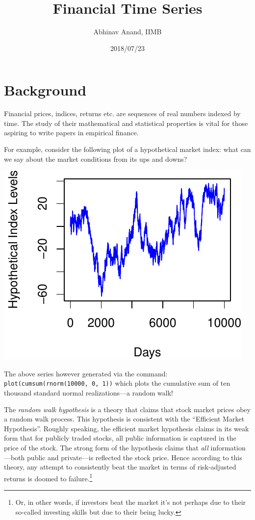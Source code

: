 \documentclass[11pt,]{article}
\title{Financial Time Series}
\author{Abhinav Anand, IIMB}
\date{2018/07/23}
\let\rmarkdownfootnote\footnote%
\def\footnote{\protect\rmarkdownfootnote}
\begin{document}
\maketitle

\section{Background}\label{background}

Financial prices, indices, returns etc. are sequences of real numbers
indexed by time. The study of their mathematical and statistical
properties is vital for those aspiring to write papers in empirical
finance.

For example, consider the following plot of a hypothetical market index:
what can we say about the market conditions from its ups and downs?

\begin{center}\includegraphics{FMC_T4_PhD_Fin_Time_Series_files/figure-latex/hypo_market_index-1} \end{center}

The above series however generated via the command:
\texttt{plot(cumsum(rnorm(10000,\ 0,\ 1))} which plots the cumulative
sum of ten thousand standard normal realizations---a random walk!

The \emph{random walk hypothesis} is a theory that claims that stock
market prices obey a random walk process. This hypothesis is consistent
with the ``Efficient Market Hypothesis''. Roughly speaking, the
efficient market hypothesis claims in its weak form that for publicly
traded stocks, all public information is captured in the price of the
stock. The strong form of the hypothesis claims that \emph{all}
information---both public and private---is reflected the stock price.
Hence according to this theory, any attempt to consistently beat the
market in terms of risk-adjusted returns is doomed to failure.\footnote{Or,
  in other words, if investors beat the market it's not perhaps due to
  their so-called investing skills but due to their being lucky.}
\end{document}
